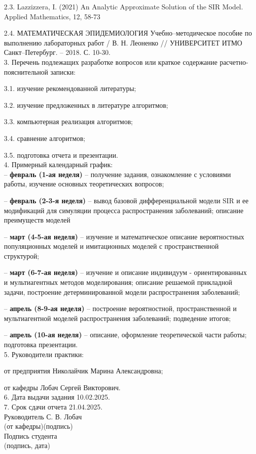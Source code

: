\documentclass[a4paper, 14pt]{extreport}
\begin{document}
	2.3. Lazzizzera, I. (2021) An Analytic Approximate Solution of the SIR Model. Applied Mathematics, 12, 58-73
	
	2.4. МАТЕМАТИЧЕСКАЯ ЭПИДЕМИОЛОГИЯ Учебно–методическое пособие
	по выполнению лабораторных работ / В. Н. Леоненко // УНИВЕРСИТЕТ ИТМО Санкт–Петербург. -- 2018. С. 10-30.\\[6mm]
	3. Перечень подлежащих разработке вопросов или краткое содержание
	расчетно-пояснительной записки:
	
	3.1. изучение рекомендованной литературы;
	
	3.2. изучение предложенных в литературе алгоритмов;
	
	3.3. компьютерная реализация алгоритмов;
	
	3.4. сравнение алгоритмов;
	
	3.5. подготовка отчета и презентации.\\[6mm]
	4. Примерный календарный график:\\[6mm]
	
	-- \textbf{февраль (1-ая неделя)} -- получение задания, ознакомление с условиями работы, изучение основных теоретических вопросов;
	
	-- \textbf{февраль (2-3-я неделя)} -- вывод базовой дифференциальной модели SIR и ее модификаций для симуляции процесса распространения заболеваний; описание преимуществ моделей
	
	-- \textbf{март (4-5-ая неделя)} -- изучение и математическое описание вероятностных популяционных моделей и имитационных моделей с пространственной структурой;
	
	-- \textbf{март (6-7-ая неделя)} -- изучение и описание индивидуум - ориентированных и мультиагентных методов моделирования; описание решаемой прикладной задачи, построение детерминированной модели распространения заболеваний;
	
	-- \textbf{апрель (8-9-ая неделя)} -- построение вероятностной, пространственной и мультиагентной моделей распространения заболеваний; подведение итогов;
	
	
	-- \textbf{апрель (10-ая неделя)} -- описание, оформление теоретической части работы; подготовка презентации.\\[6mm]
	5. Руководители практики:
	
	от предприятия Николайчик Марина Александровна;
	
	от кафедры Лобач Сергей Викторович.\\[6mm]
	6. Дата выдачи задания 10.02.2025.\\[6mm]
	7. Срок сдачи отчета\hspace*{0.7cm} 21.04.2025.\\[10mm]
	Руководитель \underline{\hspace*{4cm}} С. В. Лобач\\[-2mm]
	{\scriptsize(от кафедры)\hspace*{1.5cm}(подпись)}\\[2ex]
	\noindent Подпись студента \underline{\hspace*{6cm}} \\[-2mm]
	{\scriptsize\hspace*{6cm}(подпись, дата)}\\[2ex]
	\newpage
	
\end{document}
